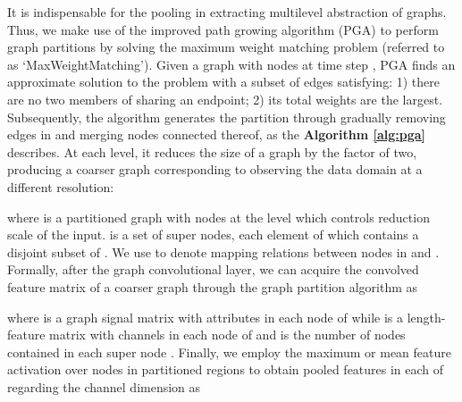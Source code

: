 \documentclass[sigconf,screen]{acmart}
\begin{document}
It is indispensable for the pooling in extracting multilevel abstraction of graphs. Thus, we make use of the improved path growing algorithm (PGA) \cite{maue2007engineering} to perform graph partitions by solving the maximum weight matching problem (referred to as `MaxWeightMatching'). Given a graph  with  nodes at time step , PGA finds an approximate solution to the problem with a subset of edges  satisfying: 1) there are no two members of  sharing an endpoint; 2) its total weights are the largest. Subsequently, the algorithm generates the partition through gradually removing edges in  and merging nodes connected thereof, as the \textbf{Algorithm \ref{alg:pga}} describes. At each level, it reduces the size of a graph by the factor of two, producing a coarser graph corresponding to observing the data domain at a different resolution:

where  is a partitioned graph with  nodes at the level  which controls reduction scale of the input.  is a set of super nodes, each element  of which contains a disjoint subset of . We use  to denote mapping relations between nodes in  and . Formally, after the graph convolutional layer, we can acquire the convolved feature matrix of a coarser graph  through the graph partition algorithm as

where  is a graph signal matrix with  attributes in each node of  while  is a length- feature matrix with  channels in each node of  and  is the number of nodes contained in each super node . Finally, we employ the maximum or mean feature activation over  nodes in partitioned regions to obtain pooled features in each  of  regarding the channel dimension as
\end{document}
